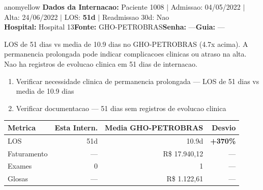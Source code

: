\documentclass[a4paper,10pt]{article}
\begin{document}
\begin{anomalycard}[Internacao 609 | GHO-PETROBRAS | MODERADO (z=2.08)]{anomyellow}
\textbf{Dados da Internacao:} Paciente 1008 $\mid$ Admissao: 04/05/2022 $\mid$ Alta: 24/06/2022 $\mid$ LOS: \textbf{51d} $\mid$ Readmissao 30d: Nao\\
\textbf{Hospital:} Hospital 13\quad\textbf{Fonte:} GHO-PETROBRAS\quad\textbf{Senha:} ---\quad\textbf{Guia:} ---\\
\vspace{2pt}\begin{tcolorbox}[colback=severityred!20,colframe=anomyellow,title={\textbf{Interpretacao de Negocio}},fonttitle=\bfseries\small,left=4pt,right=4pt,top=3pt,bottom=3pt]
{\small LOS de 51 dias vs media de 10.9 dias no GHO-PETROBRAS (4.7x acima). A permanencia prolongada pode indicar complicacoes clinicas ou atraso na alta. Nao ha registros de evolucao clinica em 51 dias de internacao.}
\end{tcolorbox}
\begin{tcolorbox}[colback=severityyellow!30,colframe=anomorange,title={\textbf{Recomendacoes Especificas}},fonttitle=\bfseries\small,left=4pt,right=4pt,top=3pt,bottom=3pt]
\begin{enumerate}[nosep,leftmargin=16pt]
\item {\small Verificar necessidade clinica de permanencia prolongada --- LOS de 51 dias vs media de 10.9 dias}
\item {\small Verificar documentacao --- 51 dias sem registros de evolucao clinica}
\end{enumerate}
\end{tcolorbox}
\begin{center}\begin{tabular}{l r r r}\toprule\textbf{Metrica} & \textbf{Esta Intern.} & \textbf{Media GHO-PETROBRAS} & \textbf{Desvio} \\\midrule
LOS & 51d & 10.9d & \textcolor{anomred}{\textbf{+370\%}} \\
Faturamento & --- & R\$ 17.940,12 & --- \\
Exames & 0 & 1 & --- \\
Glosas & --- & R\$ 1.122,61 & --- \\
\bottomrule\end{tabular}\end{center}


\end{anomalycard}
\end{document}

